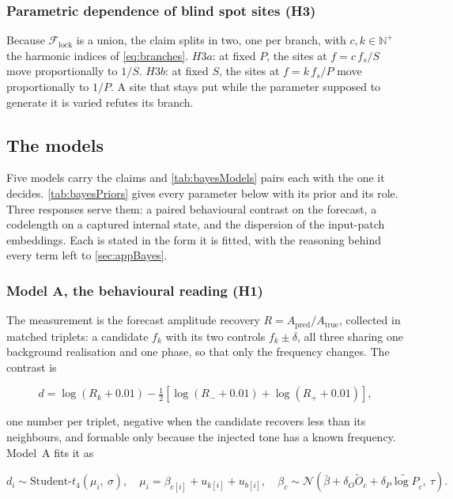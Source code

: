 \subsubsection*{Parametric dependence of blind spot sites (H3)}
Because $\mathcal F_{\mathrm{lock}}$ is a union, the claim splits in two, one per branch, with $c,k\in\mathbb{N}^{+}$ the harmonic indices of \autoref{eq:branches}. $H3a$: at fixed $P$, the sites at $f=c\,f_s/S$ move proportionally to $1/S$. $H3b$: at fixed $S$, the sites at $f=k\,f_s/P$ move proportionally to $1/P$. A site that stays put while the parameter supposed to generate it is varied refutes its branch.



\subsection{The models}

Five models carry the claims and \autoref{tab:bayesModels} pairs each with the one it decides. \autoref{tab:bayesPriors} gives every parameter below with its prior and its role. Three responses serve them: a paired behavioural contrast on the forecast, a codelength on a captured internal state, and the dispersion of the input-patch embeddings. Each is stated in the form it is fitted, with the reasoning behind every term left to \autoref{sec:appBayes}.

\subsubsection*{Model A, the behavioural reading (H1)}
The measurement is the forecast amplitude recovery $R=A_{\mathrm{pred}}/A_{\mathrm{true}}$, collected in matched triplets: a candidate $f_k$ with its two controls $f_k\pm\delta$, all three sharing one background realisation and one phase, so that only the frequency changes. The contrast is

\begin{equation}
\label{eq:d2contrast}
d = \log(R_k + 0.01) - \tfrac{1}{2}\left[\log(R_- + 0.01) + \log(R_+ + 0.01)\right],
\end{equation}

one number per triplet, negative when the candidate recovers less than its neighbours, and formable only because the injected tone has a known frequency. Model~A fits it as

\begin{equation}
\label{eq:d2hier}
d_i \sim \text{Student-}t_4(\mu_i,\ \sigma),
\quad
\mu_i = \beta_{c[i]} + u_{k[i]} + u_{b[i]},
\quad
\beta_c \sim \mathcal{N}\!\left(\bar\beta + \delta_O \widetilde O_c + \delta_P \widetilde{\log P}_c,\ \tau\right).
\end{equation}


